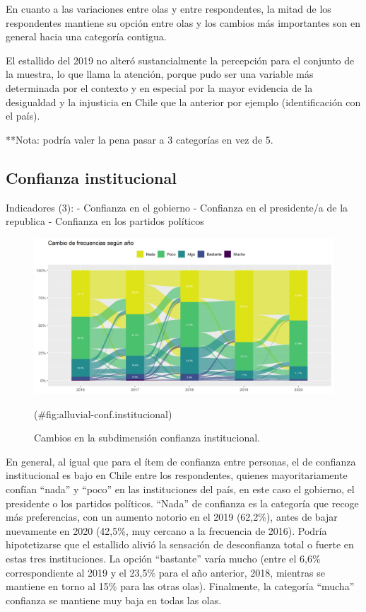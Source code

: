 \documentclass[
  12pt,
]{book}
\begin{document}
En cuanto a las variaciones entre olas y entre respondentes, la mitad de los respondentes mantiene su opción entre olas y los cambios más importantes son en general hacia una categoría contigua.

El estallido del 2019 no alteró sustancialmente la percepción para el conjunto de la muestra, lo que llama la atención, porque pudo ser una variable más determinada por el contexto y en especial por la mayor evidencia de la desigualdad y la injusticia en Chile que la anterior por ejemplo (identificación con el país).

**Nota: podría valer la pena pasar a 3 categorías en vez de 5.

\hypertarget{confianza-institucional}{%
\subsection{Confianza institucional}\label{confianza-institucional}}

Indicadores (3):
- Confianza en el gobierno
- Confianza en el presidente/a de la republica
- Confianza en los partidos políticos

\begin{figure}[H]

{\centering \includegraphics[width=1\linewidth,height=1\textheight]{output/graphs/alluvial_conf.institucional} 

}

\caption{Cambios en la subdimensión  confianza institucional.}(\#fig:alluvial-conf.institucional)
\end{figure}

En general, al igual que para el ítem de confianza entre personas, el de confianza institucional es bajo en Chile entre los respondentes, quienes mayoritariamente confían ``nada'' y ``poco'' en las instituciones del país, en este caso el gobierno, el presidente o los partidos políticos. ``Nada'' de confianza es la categoría que recoge más preferencias, con un aumento notorio en el 2019 (62,2\%), antes de bajar nuevamente en 2020 (42,5\%, muy cercano a la frecuencia de 2016). Podría hipotetizarse que el estallido alivió la sensación de desconfianza total o fuerte en estas tres instituciones. La opción ``bastante'' varía mucho (entre el 6,6\% correspondiente al 2019 y el 23,5\% para el año anterior, 2018, mientras se mantiene en torno al 15\% para las otras olas). Finalmente, la categoría ``mucha'' confianza se mantiene muy baja en todas las olas.
\end{document}
